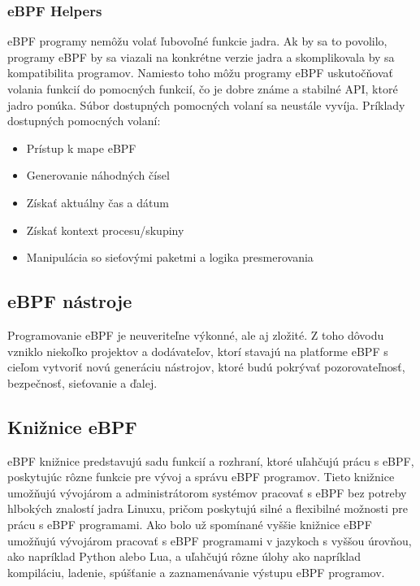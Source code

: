\subsubsection{eBPF Helpers}
eBPF programy nemôžu volať ľubovoľné funkcie jadra. Ak by sa to povolilo, programy eBPF by sa viazali na konkrétne verzie jadra 
a skomplikovala by sa kompatibilita programov. Namiesto toho môžu programy eBPF uskutočňovať volania funkcií do pomocných funkcií, 
čo je dobre známe a stabilné API, ktoré jadro ponúka. Súbor dostupných pomocných volaní sa neustále vyvíja. 
Príklady dostupných pomocných volaní:
\begin{itemize}
\item Prístup k mape eBPF
\item Generovanie náhodných čísel
\item Získať aktuálny čas a dátum
\item Získať kontext procesu/skupiny
\item Manipulácia so sieťovými paketmi a logika presmerovania
\end{itemize}

\subsection{eBPF nástroje}
Programovanie eBPF je neuveriteľne výkonné, ale aj zložité. Z toho dôvodu vzniklo niekoľko projektov a dodávateľov, 
ktorí stavajú na platforme eBPF s cieľom vytvoriť novú generáciu nástrojov, ktoré budú pokrývať pozorovateľnosť, bezpečnosť, sieťovanie a ďalej.


\subsection{Knižnice eBPF} 
eBPF knižnice predstavujú sadu funkcií a rozhraní, ktoré uľahčujú prácu s eBPF, poskytujúc rôzne funkcie pre vývoj a správu eBPF programov. Tieto knižnice umožňujú vývojárom a administrátorom systémov pracovať s eBPF bez potreby hlbokých znalostí jadra Linuxu, pričom poskytujú silné a flexibilné možnosti pre prácu s eBPF programami. Ako bolo už spomínané vyššie knižnice eBPF umožňujú vývojárom pracovať s eBPF programami v jazykoch s vyššou úrovňou, ako napríklad Python alebo Lua, a uľahčujú rôzne úlohy ako napríklad kompiláciu, ladenie, spúšťanie a zaznamenávanie výstupu eBPF programov. 

